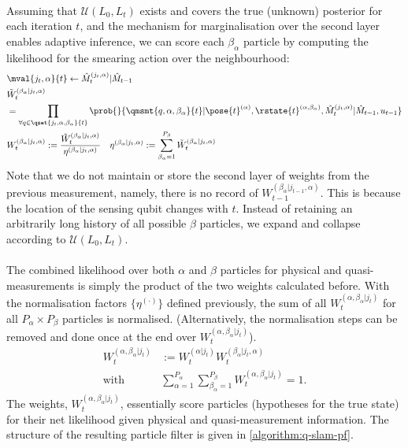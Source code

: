 \\
Assuming that $\mathcal{U}(L_0, L_t)$ exists and covers the true (unknown) posterior for each iteration $t$, and the mechanism for marginalisation over the second layer enables adaptive inference, we can score each $\beta_\alpha$ particle by computing the likelihood for the smearing action over the neighbourhood:
\begin{align}
	&\mval{j_t, \alpha}{t}  \leftarrow \hat{M}_t^{(j_t, \alpha)}| \hat{M}_{t-1} \label{eqn:slam:PF:6:beta:mapupdate}\\ 
	&\tilde{W}_t^{( \beta_\alpha | j_t, \alpha)} \nonumber \\
	&= \prod_{\forall q \in \qset{j_t, \alpha, \beta_\alpha}{t}} \prob{}{ \qmsmt{q, \alpha, \beta_\alpha}{t}|\pose{t}^{(\alpha)}, \rstate{t}^{(\alpha, \beta_\alpha)}, \hat{M}_t^{(j_t, \alpha)}| \hat{M}_{t-1}, u_{t-1 }} \label{eqn:slam:PF:7:beta:raw} \\
	&W_t^{( \beta_\alpha | j_t, \alpha)}:= \frac{\tilde{W}_t^{( \beta_\alpha | j_t, \alpha)}}{\eta^{( \beta_\alpha | j_t, \alpha)}} \quad \eta^{( \beta_\alpha | j_t, \alpha)}:= \sum_{\beta_\alpha = 1}^{P_\beta}\tilde{W}_t^{( \beta_\alpha | j_t, \alpha)} \label{eqn:slam:PF:8:beta:norm}
\end{align}	Note that we do not maintain or store the second layer of weights from the previous measurement, namely, there is no record of $W_{t-1}^{( \beta_\alpha | j_{t-1}, \alpha)}$. This is because the location of the sensing qubit changes with $t$. Instead of retaining an arbitrarily long history of all possible $\beta$ particles, we expand and collapse according to $ \mathcal{U}(L_0,L_t)$.\\
\\
The combined likelihood over both $\alpha$ and $\beta$ particles for physical and quasi-measurements is simply the product of the two weights calculated before.  With the normalisation factors $\{ \eta^{(\cdot)} \}$ defined previously, the sum of all $W_t^{(\alpha, \beta_\alpha | j_t)}$  for all $P_\alpha \times P_\beta$ particles is normalised. (Alternatively, the normalisation steps can be removed and done once at the end over  $W_t^{(\alpha, \beta_\alpha | j_t)}$).
\begin{align}
W_t^{(\alpha, \beta_\alpha | j_t)} &:= W_t^{( \alpha | j_t)}  W_t^{( \beta_\alpha | j_t, \alpha)} \label{eqn:slam:PF:9:weights:raw} \\
\mathrm{with} \quad & \sum_{\alpha=1}^{P_\alpha} \sum_{\beta_\alpha=1}^{P_\beta}  W_t^{(\alpha, \beta_\alpha | j_t)} = 1. \label{eqn:slam:PF:10:weights:norm}
\end{align} The  weights, $W_t^{(\alpha, \beta_\alpha | j_t)}$, essentially score particles (hypotheses for the true state) for their net likelihood given physical and quasi-measurement information. The structure of the resulting particle filter is given in \cref{algorithm:q-slam-pf}.

